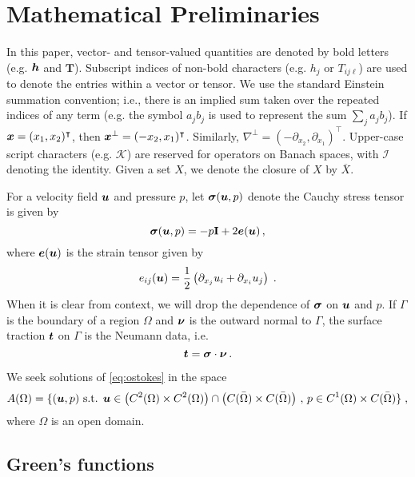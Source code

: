 \section{Mathematical Preliminaries}
\label{sec:prelim}
In this paper, vector- and tensor-valued quantities
are denoted by bold letters (e.g. ${\boldsymbol h}$ and $\mathbf{T}$). 
Subscript indices of non-bold characters (e.g. $h_j$ or $T_{ij\ell}$)
are used to denote the entries within a vector or tensor.
We use the standard Einstein summation convention; i.e., 
there is an implied sum taken over the repeated indices of 
any term (e.g. the symbol $a_{j} b_{j}$ is used to represent the sum
$\sum_{j} a_{j} b_{j}$).
If ${\boldsymbol x} = (x_1,x_2)^\intercal$, then ${\boldsymbol x}^\bot = (-x_2,x_1)^\intercal$.
Similarly, $\nabla^\bot = (-\partial_{x_2},\partial_{x_1})^\intercal$.
Upper-case script characters (e.g. $\mathcal{K}$) are reserved for
operators on Banach spaces, with $\mathcal{I}$ denoting the
identity. Given a set $X$, we denote the closure of $X$
by $\overline{X}$.

For a velocity field ${\boldsymbol u}$ and pressure $p$, let ${\boldsymbol \sigma}({\boldsymbol u},p)$
denote the Cauchy stress tensor is given by
\begin{equation}
{\boldsymbol \sigma}({\boldsymbol u},p) = -p {\bf I} + 2 {\boldsymbol e}({\boldsymbol u}) \, ,
\end{equation}
where ${\boldsymbol e}({\boldsymbol u})$ is the strain tensor given by
\begin{equation}
e_{ij}({\boldsymbol u}) = \frac{1}{2} \left( \partial_{x_j} u_i + \partial_{x_i} u_j \right) \; .
\end{equation}
When it is clear from context, we will drop the dependence of
${\boldsymbol \sigma}$ on ${\boldsymbol u}$ and $p$.
If $\Gamma$ is the boundary of a region $\Omega$ and ${\boldsymbol \nu}$ is the outward
normal to $\Gamma$, the surface traction ${\boldsymbol t}$ on $\Gamma$ 
is the Neumann data, i.e. 
\begin{equation}
{\boldsymbol t} = {\boldsymbol \sigma} \cdot {\boldsymbol \nu} \, .
\end{equation}

We seek solutions of \cref{eq:ostokes} in the space
\begin{equation}
  A(\Omega) = \{ ({\boldsymbol u},p) \textrm{ s.t. } {\boldsymbol u} \in
  \left ( C^2(\Omega)\times C^2(\Omega) \right ) \cap
  \left ( C(\bar{\Omega}) \times C(\bar{\Omega}) \right ) \, , \,
  p \in C^1(\Omega) \times C(\bar{\Omega})\} \; ,
\end{equation}
where $\Omega$ is an open domain.

\subsection{Green's functions}

